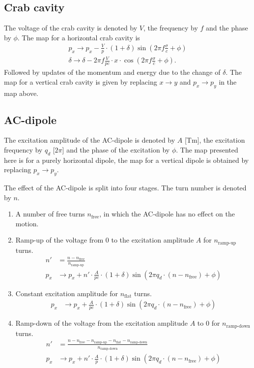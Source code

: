 \documentclass[english]{article}
\begin{document}
\subsection{Crab cavity}
The voltage of the crab cavity is denoted by $V$, the frequency by $f$ and the phase by $\phi$. The map for a horizontal
crab cavity is
\begin{align}
    p_x \to p_x - \frac{V}{p}\cdot(1+\delta) \sin\left(2\pi f\frac{\sigma}{c}+\phi \right) \\
    \delta \to \delta - 2\pi f \frac{V}{pc}\cdot x \cdot \cos\left(2\pi f \frac{\sigma}{c}+\phi\right).
\end{align}
Followed by updates of the momentum and energy due to the change of $\delta$. The map for a vertical crab cavity
is given by replacing $x\to y$ and $p_x\to p_y$ in the map above.

\subsection{AC-dipole}
The excitation amplitude of the AC-dipole is denoted by $A$ [Tm], the excitation frequency by $q_d$ [$2\pi$] and the phase of the excitation by $\phi$. The map
presented here is for a purely horizontal dipole, the map for a vertical dipole is obtained by replacing $p_x\to p_y$.

The effect of the AC-dipole is split into four stages. The turn number is denoted by $n$.
\begin{enumerate}
  \item A number of free turns $n_{\text{free}}$, in which the AC-dipole has no effect on the motion.
  \item Ramp-up of the voltage from $0$ to the excitation amplitude $A$ for $n_{\text{ramp-up}}$ turns.
        \begin{align}
            n' &= \frac{n-n_{\text{free}}}{n_{\text{ramp-up}}} \\
            p_x &\to p_x + n' \cdot \frac{A}{pc} \cdot(1+\delta) \sin\left(2\pi q_d\cdot(n-n_{\text{free}})+\phi\right)
        \end{align}
  \item Constant excitation amplitude for $n_{\text{flat}}$ turns.
        \begin{align}
            p_x &\to p_x + \frac{A}{pc}\cdot(1+\delta)\sin\left(2\pi q_d\cdot(n-n_{\text{free}})+\phi\right)
        \end{align}
  \item Ramp-down of the voltage from the excitation amplitude $A$ to $0$ for $n_{\text{ramp-down}}$ turns.
        \begin{align}
            n' &= \frac{n-n_{\text{free}}-n_{\text{ramp-up}}-n_{\text{flat}}-n_{\text{ramp-down}}}{n_{\text{ramp-down}}} \\
            p_x &\to p_x + n' \cdot \frac{A}{p} \cdot(1+\delta) \sin\left(2\pi q_d\cdot(n-n_{\text{free}})+\phi\right)
        \end{align}
\end{enumerate}
\end{document}
